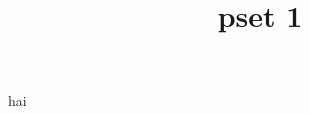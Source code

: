 \documentclass[11pt, letterpaper]{article}
\title{pset 1}
\begin{document}
\makeproblem
hai
\end{document}
